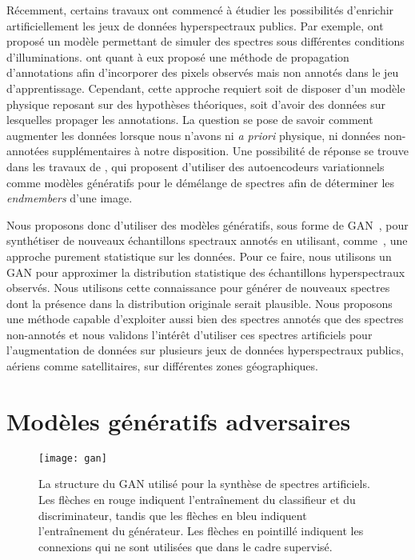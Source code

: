 Récemment, certains travaux ont commencé à étudier les possibilités d'enrichir artificiellement les jeux de données hyperspectraux publics. Par exemple, \cite{windrim_hyperspectral_2016} ont proposé un modèle permettant de simuler des spectres sous différentes conditions d'illuminations. \cite{acquarelli_convolutional_2017} ont quant à eux proposé une méthode de propagation d'annotations afin d'incorporer des pixels observés mais non annotés dans le jeu d'apprentissage. Cependant, cette approche requiert soit de disposer d'un modèle physique reposant sur des hypothèses théoriques, soit d'avoir des données sur lesquelles propager les annotations. La question se pose de savoir comment augmenter les données lorsque nous n'avons ni \emph{a priori} physique, ni données non-annotées supplémentaires à notre disposition. Une possibilité de réponse se trouve dans les travaux de \citet{gemp_inverting_2017}, qui proposent d'utiliser des autoencodeurs variationnels comme modèles génératifs pour le démélange de spectres afin de déterminer les \emph{endmembers} d'une image.

Nous proposons donc d'utiliser des modèles génératifs, sous forme de \gls{GAN}~\cite{goodfellow_generative_2014}, pour synthétiser de nouveaux échantillons spectraux annotés en utilisant, comme~\citet{gemp_inverting_2017}, une approche purement statistique sur les données. Pour ce faire, nous utilisons un \gls{GAN} pour approximer la distribution statistique des échantillons hyperspectraux observés. Nous utilisons cette connaissance pour générer de nouveaux spectres dont la présence dans la distribution originale serait plausible. Nous proposons une méthode capable d'exploiter aussi bien des spectres annotés que des spectres non-annotés et nous validons l'intérêt d'utiliser ces spectres artificiels pour l'augmentation de données sur plusieurs jeux de données hyperspectraux publics, aériens comme satellitaires, sur différentes zones géographiques.

\section{Modèles génératifs adversaires}

\begin{figure}
	\texttt{[image: gan]}
    \caption{La structure du \gls{GAN} utilisé pour la synthèse de spectres artificiels. Les flèches en \textcolor{BrickRed}{rouge} indiquent l'entraînement du classifieur et du discriminateur, tandis que les flèches en \textcolor{NavyBlue}{bleu} indiquent l'entraînement du générateur. Les flèches en pointillé indiquent les connexions qui ne sont utilisées que dans le cadre supervisé.}
    \label{fig:gan}
\end{figure}


